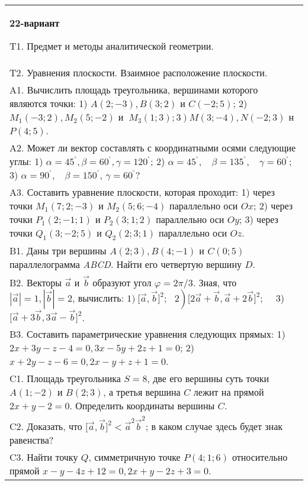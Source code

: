 \documentclass{article}
\begin{document}
\begin{tabular}{m{17cm}}
\textbf{22-вариант}
\newline

T1. Предмет и методы аналитической геометрии.
 \\
T2. 
Уравнения плоскости. Взаимное расположение плоскости.
 \\
A1. 
Вычислить площадь треугольника, вершинами которого являются точки: 1) \(A(2; - 3),B(3;2)\) и \(C( - 2;5)\); 2) \(M_{1}( - 3;2),M_{2}(5; - 2)\) и \(\left. \ M_{3}(1;3);3 \right)M(3; - 4),N( - 2;3)\) н \(P(4;5)\).
 \\
A2. Может ли вектор составлять с координатными осями следующие углы: 1) \(\alpha = 45^{{^\circ}},\beta = 60^{{^\circ}},\gamma = 120^{{^\circ}}\); 2) \(\alpha = 45^{{^\circ}},\ \ \ \ \beta = 135^{{^\circ}},\ \ \ \ \gamma = 60^{{^\circ}}\); 3) \(\alpha = 90^{{^\circ}},\ \ \ \ \beta = 150^{{^\circ}}\), \(\gamma = 60^{{^\circ}}?\)
 \\
A3. 
Составить уравнение плоскости, которая проходит: 1) через точки \(M_{1}(7;2; - 3)\) и \(M_{2}(5;6; - 4)\) параллельно оси \(Ox\); 2) через точки \(P_{1}(2; - 1;1)\) и \(P_{2}(3;1;2)\) параллельно оси \(Oy\); 3) через точки \(Q_{1}(3; - 2;5)\) и \(Q_{2}(2;3;1)\) параллельно оси \(Oz\).
 \\
B1. 
Даны три вершины \(A(2;3),B(4; - 1)\) и \(C(0;5)\) параллелограмма \emph{ABCD}. Найти его четвертую вершину \(D\).
 \\
B2. 
Векторы \(\overrightarrow{a}\) и \(\overrightarrow{b}\) образуют угол \(\varphi = 2\pi/3\). Зная, что \(|\overrightarrow{a}| = 1,|\overrightarrow{b}| = 2\), вычислить: \(1)\left. \ \lbrack\overrightarrow{a},\overrightarrow{b}\rbrack^{2};\ \ \ 2 \right)\lbrack 2\overrightarrow{a} + \overrightarrow{b},\overrightarrow{a} + 2\overrightarrow{b}\rbrack^{2};\ \ \ \ \) 3) \(\lbrack\overrightarrow{a} + 3\overrightarrow{b},3\overrightarrow{a} - \overrightarrow{b}\rbrack^{2}\).
 \\
B3. 
Составить параметрические уравнения следующих прямых: 1) \(2x + 3y - z - 4 = 0,3x - 5y + 2z + 1 = 0\); 2) \(x + 2y - z - 6 = 0,2x - y + z + 1 = 0\).
 \\
C1. 
Площадь треугольника \(S = 8\), две его вершины суть точки \(A(1; - 2)\) и \(B(2;3)\), а третья вершина \(C\) лежит на прямой \(2x + y - 2 = 0\). Определить координаты вершины \(C\).
 \\
C2. 
Доказать, что \(\lbrack\overrightarrow{a},\overrightarrow{b}\rbrack^{2} <  {\overrightarrow{a}}^{2}{\overrightarrow{b}}^{2}\); в каком случае здесь будет знак равенства?
 \\
C3. 
Найти точку \(Q\), симметричную точке \(P(4;1;6)\) относительно прямой \(x - y - 4z + 12 = 0,2x + y - 2z + 3 = 0\).
 \\

\end{tabular}
\vspace{1cm}
\end{document}
